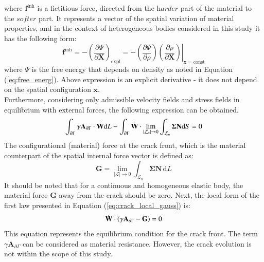 \documentclass[11pt]{acmeArticle}
\numberwithin{equation}{section}
\begin{document}
where $ \mathbf f^{\mathrm {inh}}$ is a fictitious force, directed from the $ \textit {harder}$ part of the material to the $ \textit {softer}$ part. It represents a vector of the spatial variation of material properties, and in the context of heterogeneous bodies considered in this study it has the following form:
\begin{equation}
\mathbf f^{\mathrm {inh}} = - \left( \frac{\partial \Psi }{ \partial \mathbf X} \right)_{\mathrm{expl}} = - \left. \left( \frac{\partial \Psi}{\partial \rho} \right) \left( \frac{\partial \rho}{\partial \mathbf X} \right) \right|_{\mathbf x= \mathrm{const}}
\end{equation}
where $\Psi$ is the free energy that depends on density as noted in Equation (\ref{eq:free_energ}). Above expression is an explicit derivative - it does not depend on the spatial configuration $\mathbf x$. \\
Furthermore, considering only admissible velocity fields and stress fields in equilibrium with external forces, the following expression can be obtained. 
\begin{equation}
\int_{\partial \Gamma } \gamma \mathbf A_{\partial \Gamma} \cdot {\dot {\boldsymbol {\rm W} } } \mathrm d L -\int_{\partial \Gamma} {\dot {\boldsymbol {\rm W} } } \cdot \lim_{|\mathcal L_n| \to 0 }  \int_{\mathcal L_n } \mathbf{\Sigma N} \mathrm d S  = 0
\end{equation}
The configurational (material) force at the crack front, which is the material counterpart of the spatial internal force vector is defined as:
\begin{equation}
\mathbf G = \lim_{|\mathcal{ L }|\to 0} \int_{\mathcal L_n} \mathbf{ \Sigma N}\, \mathrm d L 
\label{eq:crack_configuration_force}
\end{equation}
It should be noted that for a continuous and homogeneous elastic body, the material force $\mathbf G$ away from the crack should be zero.
Next, the local form of the first law presented in Equation (\ref{eq:crack_local_gauss}) is: 
\begin{equation}\label{eq:crack_local_first_law}
{\dot {\boldsymbol {\rm W} } } \cdot \left( \gamma \mathbf A_{\partial \Gamma} - \mathbf G \right) = 0
\end{equation}
This equation represents the equilibrium condition for the crack front. The term $ \gamma \mathbf A_{ \partial \Gamma }$ can be considered as material resistance. However, the crack evolution is not within the scope of this study. \\
\end{document}
